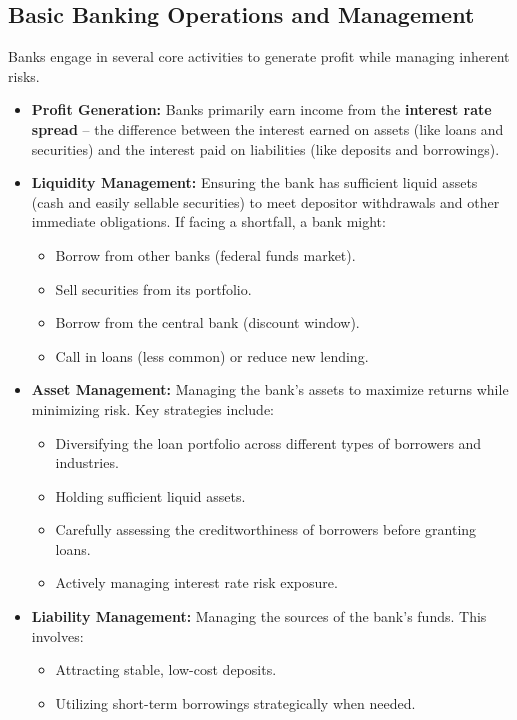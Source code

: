 \subsection{Basic Banking Operations and Management}

Banks engage in several core activities to generate profit while managing inherent risks.

\begin{itemize}
    \item \textbf{Profit Generation:} Banks primarily earn income from the \textbf{interest rate spread} – the difference between the interest earned on assets (like loans and securities) and the interest paid on liabilities (like deposits and borrowings).
    \item \textbf{Liquidity Management:} Ensuring the bank has sufficient liquid assets (cash and easily sellable securities) to meet depositor withdrawals and other immediate obligations. If facing a shortfall, a bank might:
    \begin{itemize}
        \item Borrow from other banks (federal funds market).
        \item Sell securities from its portfolio.
        \item Borrow from the central bank (discount window).
        \item Call in loans (less common) or reduce new lending.
    \end{itemize}
    \item \textbf{Asset Management:} Managing the bank's assets to maximize returns while minimizing risk. Key strategies include:
    \begin{itemize}
        \item Diversifying the loan portfolio across different types of borrowers and industries.
        \item Holding sufficient liquid assets.
        \item Carefully assessing the creditworthiness of borrowers before granting loans.
        \item Actively managing interest rate risk exposure.
    \end{itemize}
    \item \textbf{Liability Management:} Managing the sources of the bank's funds. This involves:
    \begin{itemize}
        \item Attracting stable, low-cost deposits.
        \item Utilizing short-term borrowings strategically when needed.

\end{itemize}
\end{itemize}
